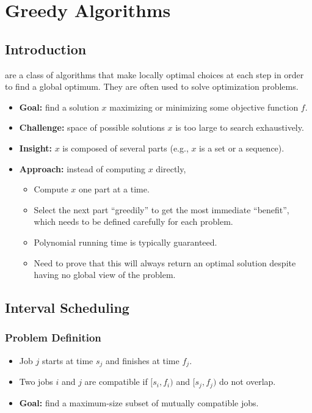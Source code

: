 \chapter{Greedy Algorithms}

\section{Introduction}

 are a class of algorithms that make locally optimal choices at each step in order to find a global optimum. They are often used to solve optimization problems.

\begin{itemize}
    \item \textbf{Goal:} find a solution $x$ maximizing or minimizing some objective function $f$.
    \item \textbf{Challenge:} space of possible solutions $x$ is too large to search exhaustively.
    \item \textbf{Insight:} $x$ is composed of several parts (e.g., $x$ is a set or a sequence).
    \item \textbf{Approach:} instead of computing $x$ directly,
    \begin{itemize}
        \item Compute $x$ one part at a time.
        \item Select the next part ``greedily'' to get the most immediate ``benefit'', which needs to be defined carefully for each problem.
        \item Polynomial running time is typically guaranteed.
        \item Need to prove that this will always return an optimal solution despite having no global view of the problem.
    \end{itemize}
\end{itemize}

\section{Interval Scheduling}\label{sec:interval-scheduling}

\subsection{Problem Definition}

\begin{itemize}
    \item Job $j$ starts at time $s_j$ and finishes at time $f_j$.
    \item Two jobs $i$ and $j$ are compatible if $[s_i, f_i)$ and $[s_j, f_j)$ do not overlap.
    \item \textbf{Goal:} find a maximum-size subset of mutually compatible jobs.
\end{itemize}

